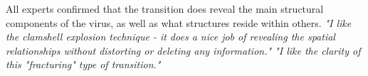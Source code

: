 









All experts confirmed that the transition does reveal the main structural components of the virus, as well as what structures reside within others. %
\textit{"I like the clamshell explosion technique - it does a nice job of revealing the spatial relationships without distorting or deleting any information." "I like the clarity of this "fracturing" type of transition."}

